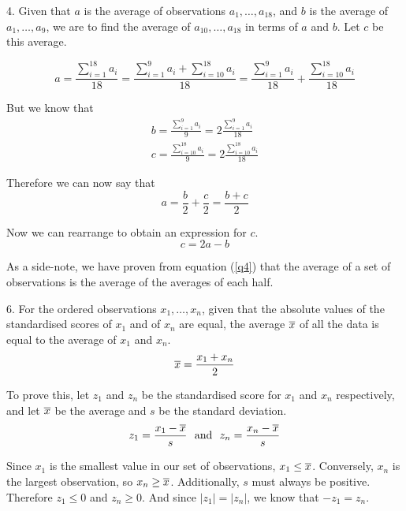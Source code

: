 \documentclass[fleqn]{article}
\begin{document}
\begin{answers}
	\item[4.]
	Given that \(a\) is the average of observations \(a_1, \dots, a_{18}\), and \(b\) is the average of \(a_1, \dots, a_9\), we are to find the average of \(a_{10}, \dots, a_{18}\) in terms of \(a\) and \(b\). Let \(c\) be this average.

	\begin{equation}
		a = \frac{\sum_{i=1}^{18}a_i}{18} = \frac{\sum_{i=1}^{9}a_i + \sum_{i=10}^{18}a_i}{18} = \frac{\sum_{i=1}^{9}a_i}{18} + \frac{\sum_{i=10}^{18}a_i}{18}
	\end{equation}

	But we know that
	\begin{gather}
		b = \frac{\sum_{i=1}^{9}a_i}{9} = 2 \frac{\sum_{i=1}^{9}a_i}{18} \\
		c = \frac{\sum_{i=10}^{18}a_i}{9} = 2 \frac{\sum_{i=10}^{18}a_i}{18}
	\end{gather}

	Therefore we can now say that
	\begin{equation}
		a = \frac{b}{2} + \frac{c}{2} = \frac{b + c}{2} \label{q4}
	\end{equation}

	Now we can rearrange to obtain an expression for \(c\).
	\begin{equation}
		c = 2a - b
	\end{equation}

	As a side-note, we have proven from equation (\ref{q4}) that the average of a set of observations is the average of the averages of each half.

	\item[6.]
	For the ordered observations \(x_1, \dots, x_n\), given that the absolute values of the standardised scores of \(x_1\) and of \(x_n\) are equal, the average \(\overline{x}\) of all the data is equal to the average of \(x_1\) and \(x_n\).
	\begin{equation}
		\overline{x} = \frac{x_1 + x_n}{2} \label{q6-x-bar}
	\end{equation}

	To prove this, let \(z_1\) and \(z_n\) be the standardised score for \(x_1\) and \(x_n\) respectively, and let \(\overline{x}\) be the average and \(s\) be the standard deviation.
	\begin{equation}
		z_1 = \frac{x_1 - \overline{x}}{s} \ \text{ and } \ z_n = \frac{x_n - \overline{x}}{s} \label{q6-z}
	\end{equation}

	Since \(x_1\) is the smallest value in our set of observations, \(x_1 \leq \overline{x}\). Conversely, \(x_n\) is the largest observation, so \(x_n \geq \overline{x}\). Additionally, \(s\) must always be positive. Therefore \(z_1 \leq 0\) and \(z_n \geq 0\). And since \(|z_1| = |z_n|\), we know that \(-z_1 = z_n\).


\end{answers}
\end{document}
